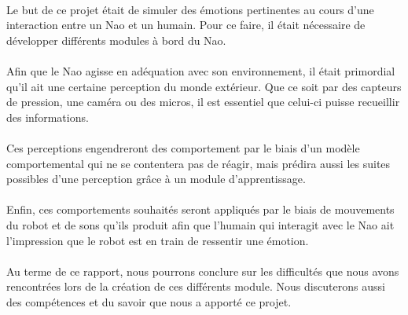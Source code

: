\paragraph{}
Le but de ce projet était de simuler des émotions pertinentes au cours d'une
interaction entre un Nao et un humain. Pour ce faire, il était nécessaire
de développer différents modules à bord du Nao.

\paragraph{}
Afin que le Nao agisse en adéquation avec son environnement, il était
primordial qu'il ait une certaine perception du monde extérieur. Que ce soit
par des capteurs de pression, une caméra ou des micros, il est essentiel que
celui-ci puisse recueillir des informations.

\paragraph{}
Ces perceptions engendreront des comportement par le biais d'un modèle
comportemental qui ne se contentera pas de réagir, mais prédira aussi les
suites possibles d'une perception grâce à un module d'apprentissage.

\paragraph{}
Enfin, ces comportements souhaités seront appliqués par le biais de
mouvements du robot et de sons qu'ils produit afin que l'humain qui
interagit avec le Nao ait l'impression que le robot est en train de ressentir
une émotion.

\paragraph{}
Au terme de ce rapport, nous pourrons conclure sur les difficultés que nous
avons rencontrées lors de la création de ces différents module. Nous
discuterons aussi des compétences et du savoir que nous a apporté ce projet.

